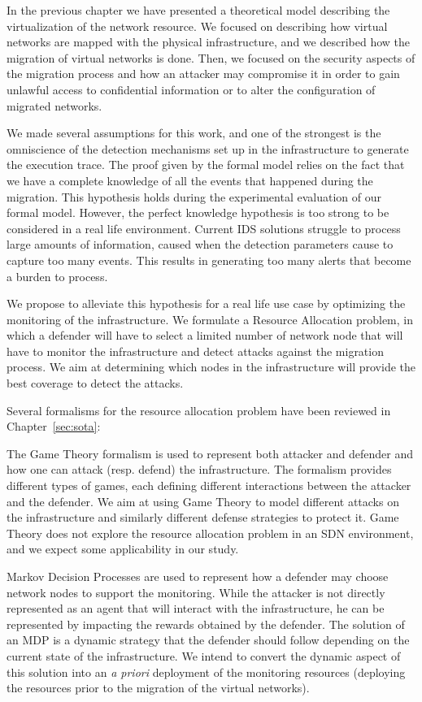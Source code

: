 In the previous chapter we have presented a theoretical model describing the virtualization of the network resource. We focused on describing how virtual networks are mapped with the physical infrastructure, and we described how the migration of virtual networks is done. Then, we focused on the security aspects of the migration process and how an attacker may compromise it in order to gain unlawful access to confidential information or to alter the configuration of migrated networks.

We made several assumptions for this work, and one of the strongest is the omniscience of the detection mechanisms set up in the infrastructure to generate the execution trace. The proof given by the formal model relies on the fact that we have a complete knowledge of all the events that happened during the migration.  This hypothesis holds during the experimental evaluation of our formal model. 
However, the perfect knowledge hypothesis is too strong to be considered in a real life environment. 
Current IDS solutions struggle to process large amounts of information, caused when the detection parameters cause to capture too many events. This results in generating too many alerts that become a burden to process.

We propose to alleviate this hypothesis for a real life use case by optimizing the monitoring of the infrastructure. We formulate a Resource Allocation problem, in which a defender will have to select a limited number of network node that will have to monitor the infrastructure and detect attacks against the migration process. We aim at determining which nodes in the infrastructure will provide the best coverage to detect the attacks.

Several formalisms for the resource allocation problem have been reviewed in Chapter~\ref{sec:sota}:

The Game Theory formalism is used to represent both attacker and defender and how one can attack (resp. defend) the infrastructure.
The formalism provides different types of games, each defining different interactions between the attacker and the defender.
We aim at using Game Theory to model different attacks on the infrastructure and similarly different defense strategies to protect it.
Game Theory does not explore the resource allocation problem in an SDN environment, and we expect some applicability in our study.

Markov Decision Processes are used to represent how a defender may choose network nodes to support the monitoring.
While the attacker is not directly represented as an agent that will interact with the infrastructure, he can be represented by impacting the rewards obtained by the defender.
The solution of an MDP is a dynamic strategy that the defender should follow depending on the current state of the infrastructure.
We intend to convert the dynamic aspect of this solution into an \textit{a priori} deployment of the monitoring resources (\ie deploying the resources prior to the migration of the virtual networks).